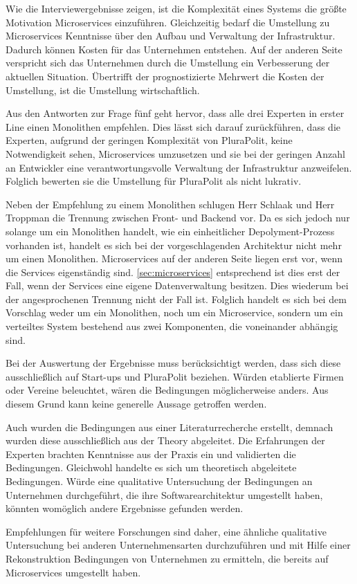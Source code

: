 Wie die Interviewergebnisse zeigen, ist die Komplexität eines Systems die größte Motivation Microservices einzuführen. Gleichzeitig bedarf die Umstellung zu Microservices Kenntnisse über den Aufbau und Verwaltung der Infrastruktur. Dadurch können Kosten für das Unternehmen entstehen. Auf der anderen Seite verspricht sich das Unternehmen durch die Umstellung ein Verbesserung der aktuellen Situation. Übertrifft der prognostizierte Mehrwert die Kosten der Umstellung, ist die Umstellung wirtschaftlich.

Aus den Antworten zur Frage fünf geht hervor, dass alle drei Experten in erster Line einen Monolithen empfehlen. Dies lässt sich darauf zurückführen, dass die Experten, aufgrund der geringen Komplexität von PluraPolit, keine Notwendigkeit sehen, Microservices umzusetzen und sie bei der geringen Anzahl an Entwickler eine verantwortungsvolle Verwaltung der Infrastruktur anzweifelen. Folglich bewerten sie die Umstellung für PluraPolit als nicht lukrativ.

Neben der Empfehlung zu einem Monolithen schlugen Herr Schlaak und Herr Troppman die Trennung zwischen Front- und Backend vor.
Da es sich jedoch nur solange um ein Monolithen handelt, wie ein einheitlicher Depolyment-Prozess vorhanden ist, handelt es sich bei der vorgeschlagenden Architektur nicht mehr um einen Monolithen.
Microservices auf der anderen Seite liegen erst vor, wenn die Services eigenständig sind. \cref{sec:microservices} entsprechend ist dies erst der Fall, wenn der Services eine eigene Datenverwaltung besitzen. Dies wiederum bei der angesprochenen Trennung nicht der Fall ist. Folglich handelt es sich bei dem Vorschlag weder um ein Monolithen, noch um ein Microservice, sondern um ein verteiltes System bestehend aus zwei Komponenten, die voneinander abhängig sind.

Bei der Auswertung der Ergebnisse muss berücksichtigt werden, dass sich diese ausschließlich auf Start-ups und PluraPolit beziehen. Würden etablierte Firmen oder Vereine beleuchtet, wären die Bedingungen möglicherweise anders. Aus diesem Grund kann keine generelle Aussage getroffen werden.

Auch wurden die Bedingungen aus einer Literaturrecherche erstellt, demnach wurden diese ausschließlich aus der Theory abgeleitet. Die Erfahrungen der Experten brachten Kenntnisse aus der Praxis ein und validierten die Bedingungen. 
Gleichwohl handelte es sich um theoretisch abgeleitete Bedingungen.
Würde eine qualitative Untersuchung der Bedingungen an Unternehmen durchgeführt, die ihre Softwarearchitektur umgestellt haben, könnten womöglich andere Ergebnisse gefunden werden.

Empfehlungen für weitere Forschungen sind daher, eine ähnliche qualitative Untersuchung bei anderen Unternehmensarten durchzuführen und mit Hilfe einer Rekonstruktion Bedingungen von Unternehmen zu ermitteln, die bereits auf Microservices umgestellt haben.
